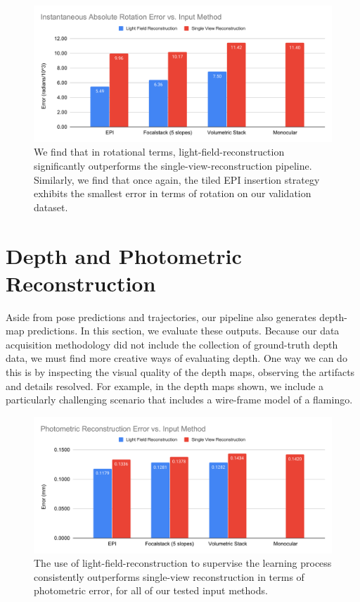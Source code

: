 \begin{figure}[H]
    \includegraphics[width=\textwidth]{images/result-examples/bargraphs/iare-vs-input-method2.pdf}
    \caption[Instantaneous rotational error vs. input methods.]{We find that in rotational terms, light-field-reconstruction significantly outperforms the single-view-reconstruction pipeline. Similarly, we find that once again, the tiled EPI insertion strategy exhibits the smallest error in terms of rotation on our validation dataset.}
\end{figure}
\section{Depth and Photometric Reconstruction}

Aside from pose predictions and trajectories, our pipeline also generates depth-map predictions. In this section, we evaluate these outputs. Because our data acquisition methodology did not include the collection of ground-truth depth data, we must find more creative ways of evaluating depth. One way we can do this is by inspecting the visual quality of the depth maps, observing the artifacts and details resolved. For example, in the depth maps shown, we include a particularly challenging scenario that includes a wire-frame model of a flamingo. 

\begin{figure}[H]
    \includegraphics[width=\textwidth]{images/result-examples/bargraphs/photometric-error-vs-inputmethod2.pdf}
    \caption[Photometric reconstruction error vs. input methods]{The use of light-field-reconstruction to supervise the learning process consistently outperforms single-view reconstruction in terms of photometric error, for all of our tested input methods.}
\end{figure}

